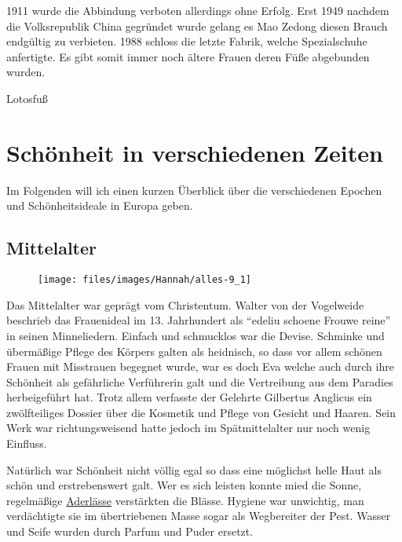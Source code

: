1911 wurde die Abbindung verboten allerdings ohne Erfolg. Erst 1949 nachdem
die Volksrepublik China gegründet wurde gelang es Mao Zedong diesen Brauch endgültig zu verbieten.
1988 schloss die letzte Fabrik, welche Spezialschuhe anfertigte. Es gibt somit immer noch ältere
Frauen deren Füße abgebunden wurden.

\begin{figurewrapper}
	 \hfill
	\caption{Lotosfuß}
\end{figurewrapper}


\section{Schönheit in verschiedenen Zeiten}
\label{sec:Hannah_Haid:beauty_over_time}

Im Folgenden will ich einen kurzen Überblick über die verschiedenen Epochen und Schönheitsideale
in Europa geben.

\subsection{Mittelalter}

\begin{wrapfigure}{r}{0pt}
	\texttt{[image: files/images/Hannah/alles-9\_1]}%
\end{wrapfigure}
Das Mittelalter war geprägt vom Christentum. Walter von der Vogelweide beschrieb das Frauenideal im
13. Jahrhundert als \enquote{edeliu schoene Frouwe reine} in seinen Minneliedern. Einfach und
schmucklos war die Devise. Schminke und übermäßige Pflege des Körpers galten als heidnisch, so dass
vor allem schönen Frauen mit Misstrauen begegnet wurde, war es doch Eva welche auch durch
ihre Schönheit als gefährliche Verführerin galt und die Vertreibung
aus dem Paradies herbeigeführt hat. Trotz allem verfasste der Gelehrte Gilbertus
Anglicus ein zwölfteiliges Dossier über die Kosmetik und Pflege von Gesicht und Haaren. Sein Werk war
richtungsweisend hatte jedoch im Spätmittelalter nur noch wenig Einfluss.

Natürlich war Schönheit nicht völlig egal so dass eine möglichst helle Haut als schön und
erstrebenswert galt. Wer es sich leisten konnte mied die Sonne, regelmäßige
\href{http://de.wikipedia.org/wiki/Aderlass}{Aderlässe} verstärkten die
Blässe. Hygiene war unwichtig, man verdächtigte sie im übertriebenen Masse sogar als Wegbereiter der
Pest. Wasser und Seife wurden durch Parfum und Puder ersetzt.


